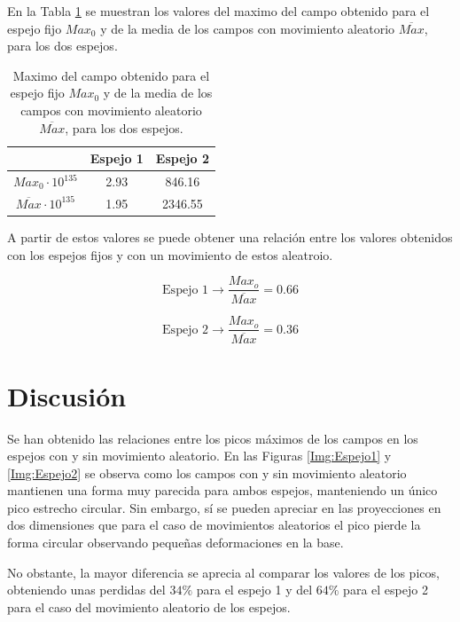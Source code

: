 \documentclass[twoside]{article}
\begin{document}
\begin{multicols}{2}
				En la Tabla \ref{Tab:Maximum} se muestran los valores del maximo del campo obtenido para el espejo fijo $Max_0$ y de la media de los campos con movimiento aleatorio $\overline{Max}$, para los dos espejos.

					\begin{table}[H]
						\centering
						\begin{tabular}{c | c c }
							\hline
							\centering
								 & Espejo 1 & Espejo 2 \\ \hline
								$Max_0 \cdot 10^{135}$ & 2.93 & 846.16 \\
								$\overline{Max} \cdot 10^{135}$ & 1.95 & 2346.55 \\ \hline

						\end{tabular}
						\caption{\label{Tab:Maximum}Maximo del campo obtenido para el espejo fijo $Max_0$ y de la media de los campos con movimiento aleatorio $\overline{Max}$, para los dos espejos.}
					\end{table}
			
				A partir de estos valores se puede obtener una relaci\'on entre los valores obtenidos con los espejos fijos y con un movimiento de estos aleatroio.

					\begin{equation}
						\textrm{Espejo 1} \rightarrow \frac {Max_o}{\overline{Max}} = 0.66
					\end{equation}

					\begin{equation}
						\textrm{Espejo 2} \rightarrow \frac {Max_o}{\overline{Max}} = 0.36
					\end{equation}

			\section{Discusión}

				Se han obtenido las relaciones entre los picos máximos de los campos en los espejos con y sin movimiento aleatorio. En las Figuras \ref{Img:Espejo1} y \ref{Img:Espejo2} se observa como los campos con y sin movimiento aleatorio mantienen una forma muy parecida para ambos espejos, manteniendo un único pico estrecho circular. Sin embargo, sí se pueden apreciar en las proyecciones en dos dimensiones que para el caso de movimientos aleatorios el pico pierde la forma circular observando pequeñas deformaciones en la base.

				No obstante, la mayor diferencia se aprecia al comparar los valores de los picos, obteniendo unas perdidas del $34\%$ para el espejo 1 y del $64\%$ para el espejo 2 para el caso del movimiento aleatorio de los espejos.


\end{multicols}
\end{document}
